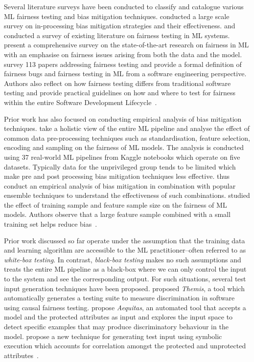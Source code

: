 \documentclass{article}
\begin{document}
Several literature surveys have been conducted to classify and
catalogue various ML fairness testing and bias mitigation techniques.
\citeauthor{wan2021modeling} conducted a large scale survey on
in-processing bias mitigation strategies and their effectiveness.
\citeauthor{chen2022fairness} and \citeauthor{mehrabi2021survey}
conducted a survey of existing literature on fairness testing in ML
systems. \citeauthor{mehrabi2021survey} present a comprehensive survey
on the state-of-the-art research on fairness in ML with an emphasise
on fairness issues arising from both the data and the model.
\citeauthor{chen2022fairness} survey 113 papers addressing fairness
testing and provide a formal definition of fairness bugs and fairness
testing in ML from a software engineering perspective. Authors also reflect on how
fairness testing differs from traditional software testing and provide
practical guidelines on how and where to test for fairness within the
entire Software Development
Lifecycle \cite{wan2021modeling,chen2022fairness,mehrabi2021survey}.

Prior work has also focused on conducting empirical analysis of bias
mitigation techniques. \citeauthor{biswas2021fair} take a holistic
view of the entire ML pipeline and analyse the effect of common data
pre-processing techniques such as standardisation, feature selection,
encoding and sampling on the fairness of ML models. The analysis is
conducted using 37 real-world ML pipelines from Kaggle notebooks which
operate on five datasets. Typically data for the unprivileged group
tends to be limited which make pre and post processing bias mitigation
techniques less effective. \citeauthor{feffer2022empirical} thus
conduct an empirical analysis of bias mitigation in combination with
popular ensemble techniques to understand the effectiveness of such
combinations. \citeauthor{zhang2021ignorance} studied the effect of
training sample and feature sample size on the fairness of ML
models. Authors observe that a large feature sample combined with
a small training set helps reduce
bias \cite{biswas2021fair,feffer2022empirical,zhang2021ignorance}.

Prior work discussed so far operate under the assumption that the
training data and learning algorithm are accessible to the ML
practitioner--often referred to as \emph{white-box testing}. In
contrast, \emph{black-box testing} makes no such assumptions and
treats the entire ML pipeline as a black-box where we can only control
the input to the system and see the corresponding output. For such
situations, several test input generation techniques have been
proposed. \citeauthor{galhotra2017fairness} proposed \emph{Themis},
a tool which automatically generates a testing suite to measure
discrimination in software using causal fairness
testing. \citeauthor{udeshi2018automated} propose \emph{Aequitas}, an
automated tool that accepts a model and the protected attributes as
input and explores the input space to detect specific examples that
may produce discriminatory behaviour in the
model. \citeauthor{aggarwal2019black} propose a new technique for
generating test input using symbolic execution which accounts for
correlation amongst the protected and unprotected
attributes \cite{aggarwal2019black,udeshi2018automated,galhotra2017fairness}.
\end{document}
